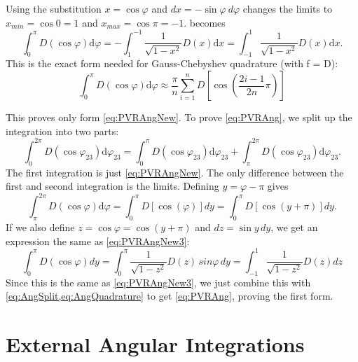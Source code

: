 \documentclass[Dissertation.tex]{subfiles}
\begin{document}
Using the substitution $x = \cos \varphi$ and $dx = -\sin \varphi \:d\varphi$
changes the limits to $x_{min} \!\!=\! \cos 0 \! =\! 1$ and
$x_{max} = \cos \pi = -1$.  becomes
\begin{equation}
\int_0^\pi  D\left( {\cos \varphi } \right){\textrm{d}}\varphi = - \int_1^{ - 1} \frac{1}{{\sqrt {1 - {x^2}} }}D\left( x \right){\textrm{d}}x = \int_{ - 1}^1 \frac{1}{{\sqrt {1 - {x^2}} }}D\left( x \right){\textrm{d}}x.
\label{eq:PVRAngNew3}
\end{equation}
This is the exact form needed for Gauss-Chebyshev quadrature (with f = D):
\begin{equation}
\int_0^\pi  D\left( {\cos \varphi } \right){\textrm{d}}\varphi \approx \frac{\pi }{n} \sum_{i = 1}^n D\!\left[ {\cos \left( {\frac{{2i - 1}}{{2n}}\pi } \right)} \right]
\label{eq:AngQuadrature}
\end{equation}

This proves only form \cref{eq:PVRAngNew}. To prove \cref{eq:PVRAng}, we split up the integration into two parts:
\begin{equation}
\int_0^{2\pi } D\left( {\cos {\varphi_{23}}} \right){\textrm{d}}{\varphi_{23}} = \int_0^\pi  D\left( {\cos {\varphi_{23}}} \right){\textrm{d}}{\varphi_{23}} + \int _\pi ^{2\pi } D\left( {\cos {\varphi _{23}}} \right){\textrm{d}}{\varphi _{23}}.
\label{eq:AngSplit}
\end{equation}
The first integration is just \cref{eq:PVRAngNew}. The only difference between the first and second integration is the limits. Defining $y = \varphi - \pi$ gives
\begin{equation}
\int _\pi ^{2\pi } D\left( {\cos {\varphi}} \right){\textrm{d}}{\varphi} = \int_0^\pi D\left[\cos(\varphi)\right] dy = \int_0^\pi D\left[\cos(y+\pi)\right] dy.
\end{equation}
If we also define $z = \cos \varphi = \cos(y+\pi)$ and $dz = \sin y \,dy$, we get an expression the same as \cref{eq:PVRAngNew3}:
\begin{equation}
\int_0^\pi D\left(\cos\varphi\right) dy = \int_0^\pi \frac{1}{\sqrt{1-z^2}} D(z)\, sin\varphi\, dy = \int_{-1}^1 \frac{1}{\sqrt{1-z^2}} D(z) dz
\end{equation}
Since this is the same as \cref{eq:PVRAngNew3}, we just combine this with \cref{eq:AngSplit,eq:AngQuadrature} to get \cref{eq:PVRAng}, proving the first form.


\section{External Angular Integrations}
\label{sec:AngularInt}
\end{document}
